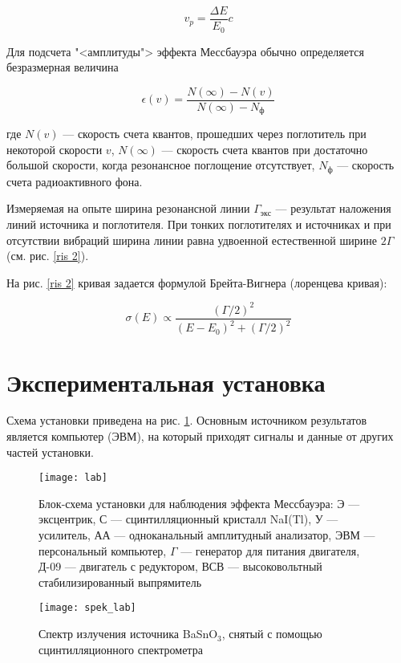 \documentclass[a4paper, 12pt]{article}
\begin{document}
	\begin{equation}\label{vr}
	v_p = \dfrac{\Delta E}{E_0}c
	\end{equation}

	Для подсчета "<амплитуды"> эффекта Мессбауэра обычно определяется безразмерная величина

	\begin{equation}\label{epsi;on}
	\epsilon(v) = \dfrac{N (\infty) - N(v)}{N (\infty) - N_ф}
	\end{equation}

	где $ N(v) $ --- скорость счета квантов, прошедших через поглотитель при
	некоторой скорости $ v $, $ N (\infty) $ --- скорость счета квантов при достаточно
	большой скорости, когда резонансное поглощение отсутствует, $ N_ф  $ --- скорость счета радиоактивного фона.

	Измеряемая на опыте ширина резонансной линии $  \Gamma_{экс} $ --- результат наложения линий источника и поглотителя. При тонких поглотителях и источниках и при отсутствии вибраций ширина линии равна удвоенной естественной ширине $ 2\Gamma $ (см. рис. \ref{ris 2}).

	На рис. \ref{ris 2} кривая задается формулой Брейта-Вигнера (лоренцева кривая):

	\begin{equation}\label{B-V}
	\sigma(E) \propto \dfrac{(\Gamma/2)^2}{(E - E_0)^2 + (\Gamma/2)^2}
	\end{equation}

	\section{Экспериментальная установка}

	Схема установки приведена на рис. \ref{lab}. Основным источником результатов является компьютер (ЭВМ), на который приходят сигналы и данные от других частей установки.

	\begin{figure}[h!]
		\centering
		\texttt{[image: lab]}
		\caption{Блок-схема установки для наблюдения эффекта Мессбауэра: Э --- эксцентрик, С --- сцинтилляционный кристалл NaI(Tl), У --- усилитель, АА --- одноканальный амплитудный анализатор, ЭВМ --- персональный компьютер, $ \Gamma $ --- генератор для питания двигателя, Д-09 --- двигатель с редуктором, ВСВ --- высоковольтный стабилизированный выпрямитель}
		\label{lab}
	\end{figure}


	\begin{wrapfigure}{l}{0.35\linewidth}
		\texttt{[image: spek\_lab]}
		\caption{Спектр излучения источника BaSnO$_3 $, снятый с
			помощью сцинтилляционного спектрометра}
		\label{spek_lab}
	\end{wrapfigure}
\end{document}
